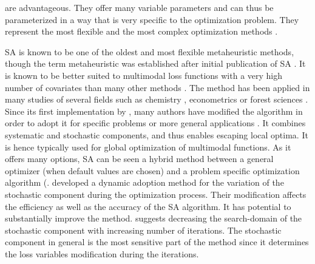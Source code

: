 are advantageous. They offer many variable parameters and can thus be parameterized in a way that is very specific to the optimization problem. They represent the most flexible and the most complex optimization methods \citep{blum_2003}.

SA \citep{kirkpatrick_1983} is known to be one of the oldest and most flexible metaheuristic methods, though the term metaheuristic was established after initial publication of SA \citep{blum_2003}.  It is known to be better suited to multimodal loss functions with a very high number of covariates than many other methods \citep{corana_1987}. The method has been applied in many studies of several fields such as chemistry \citep{agostini_2006}, econometrics \citep{ingber_1993} or forest sciences \citep{baskent_2002, boston_1999}. Since its first implementation by \citet{kirkpatrick_1983}, many authors have modified the algorithm in order to adopt it for specific problems \citep[e.g.][]{desarbo_1989, goffe_1996} or more general applications \citep[e.g.][]{xiang_2013}. It combines systematic and stochastic components, and thus enables escaping local optima. It is hence typically used for global optimization of multimodal functions. As it offers many options, SA can be seen a hybrid method between a general optimizer (when default values are chosen) and a problem specific optimization algorithm (\citep{wegener_2005}. \citet{corana_1987} developed a dynamic adoption method for the variation of the stochastic component during the optimization process. Their modification affects the efficiency as well as the accuracy of the SA algorithm. It has potential to substantially improve the method. \citet{pronzato_1984} suggests decreasing the search-domain of the stochastic component with increasing number of iterations. The stochastic component in general is the most sensitive part of the method since it determines the loss variables modification during the iterations.

